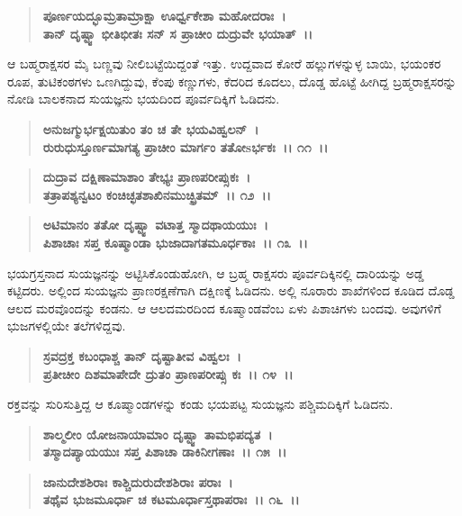 \begin{verse}
\textbf{ಪೂರ್ಣಯದ್ಭೂಮ್ರತಾಮ್ರಾಕ್ಷಾ ಊರ್ಧ್ವಕೇಶಾ ಮಹೋದರಾಃ~।}\\\textbf{ತಾನ್ ದೃಷ್ಟ್ವಾ ಭೀತಿಭೀತಃ ಸನ್ ಸ ಪ್ರಾಚೀಂ ದುದ್ರುವೇ ಭಯಾತ್~।।}
\end{verse}

ಆ ಬಹ್ಮರಾಕ್ಷಸರ ಮೈ ಬಣ್ಣವು ನೀಲಿಬಟ್ಟೆಯಿದ್ದಂತೆ ಇತ್ತು. ಉದ್ದವಾದ ಕೋರೆ ಹಲ್ಲುಗಳನ್ನುಳ್ಳ ಬಾಯಿ, ಭಯಂಕರ ರೂಪ, ತುಟಿಕಂಠಗಳು ಒಣಗಿದ್ದುವು, ಕೆಂಪು ಕಣ್ಣುಗಳು, ಕೆದರಿದ ಕೂದಲು, ದೊಡ್ಡ ಹೊಟ್ಟೆ ಹೀಗಿದ್ದ ಬ್ರಹ್ಮರಾಕ್ಷಸರನ್ನು ನೋಡಿ ಬಾಲಕನಾದ ಸುಯಜ್ಞನು ಭಯದಿಂದ ಪೂರ್ವದಿಕ್ಕಿಗೆ ಓಡಿದನು.

\begin{verse}
\textbf{ಅನುಜಗ್ಮುರ್ಭಕ್ಷಯಿತುಂ ತಂ ಚ ತೇ ಭಯವಿಹ್ವಲನ್~।}\\\textbf{ರುರುಧುಸ್ತೂರ್ಣಮಾಗತ್ಯ ಪ್ರಾಚೀಂ ಮಾರ್ಗಂ ತತೋsರ್ಭಕಃ~।। ೧೧~।। }
\end{verse}

\begin{verse}
\textbf{ದುದ್ರಾವ ದಕ್ಷಿಣಾಮಾಶಾಂ ತೇಭ್ಯಃ ಪ್ರಾಣಪರೀಪ್ಸುಕಃ~।}\\\textbf{ತತ್ರಾಪಶ್ಯನ್ವಟಂ ಕಂಚಿಚ್ಛತಶಾಖಿನಮುಚ್ಛ್ರಿತಮ್~।। ೧೨~।। }
\end{verse}

\begin{verse}
\textbf{ಅಟಿಮಾನಂ ತತೋ ದೃಷ್ಟ್ವಾ ವಟಾತ್ತ ಸ್ಮಾದಥಾಯಯುಃ~।}\\\textbf{ಪಿಶಾಚಾಃ ಸಪ್ತ ಕೂಷ್ಮಾಂಡಾ ಭುಜಾದಾಗತಮೂರ್ಧಕಾಃ~।। ೧೩~।।}
\end{verse}

ಭಯಗ್ರಸ್ತನಾದ ಸುಯಜ್ಞನನ್ನು ಅಟ್ಟಿಸಿಕೊಂಡುಹೋಗಿ, ಆ ಬ್ರಹ್ಮ ರಾಕ್ಷಸರು ಪೂರ್ವದಿಕ್ಕಿನಲ್ಲಿ ದಾರಿಯನ್ನು ಅಡ್ಡ ಕಟ್ಟಿದರು. ಅಲ್ಲಿಂದ ಸುಯಜ್ಞನು ಪ್ರಾಣರಕ್ಷಣೆಗಾಗಿ ದಕ್ಷಿಣಕ್ಕೆ ಓಡಿದನು. ಅಲ್ಲಿ ನೂರಾರು ಶಾಖೆಗಳಿಂದ ಕೂಡಿದ ದೊಡ್ಡ ಆಲದ ಮರವೊಂದನ್ನು ಕಂಡನು. ಆ ಆಲದಮರದಿಂದ ಕೂಷ್ಮಾಂಡವೆಂಬ ಏಳು ಪಿಶಾಚಿಗಳು ಬಂದವು. ಅವುಗಳಿಗೆ ಭುಜಗಳಲ್ಲಿಯೇ ತಲೆಗಳಿದ್ದವು.

\begin{verse}
\textbf{ಸ್ರವದ್ರಕ್ತ ಕಬಂಧಾಶ್ಚ ತಾನ್ ದೃಷ್ಟಾತೀವ ವಿಹ್ವಲಃ~।}\\\textbf{ಪ್ರತೀಚೀಂ ದಿಶಮಾಪೇದೇ ದ್ರುತಂ ಪ್ರಾಣಪರೀಪ್ಸು ಕಃ~।। ೧೪~।।}
\end{verse}

ರಕ್ತವನ್ನು ಸುರಿಸುತ್ತಿದ್ದ ಆ ಕೂಷ್ಮಾಂಡಗಳನ್ನು ಕಂಡು ಭಯಪಟ್ಟ ಸುಯಜ್ಞನು ಪಶ್ಚಿಮದಿಕ್ಕಿಗೆ ಓಡಿದನು.

\begin{verse}
\textbf{ಶಾಲ್ಮಲೀಂ ಯೋಜನಾಯಾಮಾಂ ದೃಷ್ಟ್ವಾ ತಾಮಭಿಪದ್ಯತ~।}\\\textbf{ತಸ್ಮಾದಪ್ಯಾಯಯುಃ ಸಪ್ತ ಪಿಶಾಚಾ ಡಾಕಿನೀಗಣಾಃ~।। ೧೫~।। }
\end{verse}

\begin{verse}
\textbf{ಜಾನುದೇಶಶಿರಾಃ ಕಾಶ್ಚಿದುರುದೇಶಶಿರಾಃ ಪರಾಃ~।}\\\textbf{ತಥೈವ ಭುಜಮೂರ್ಧಾ ಚ ಕಟಮೂರ್ಧಾಸ್ತಥಾಪರಾಃ~।। ೧೬~।।} 
\end{verse}


